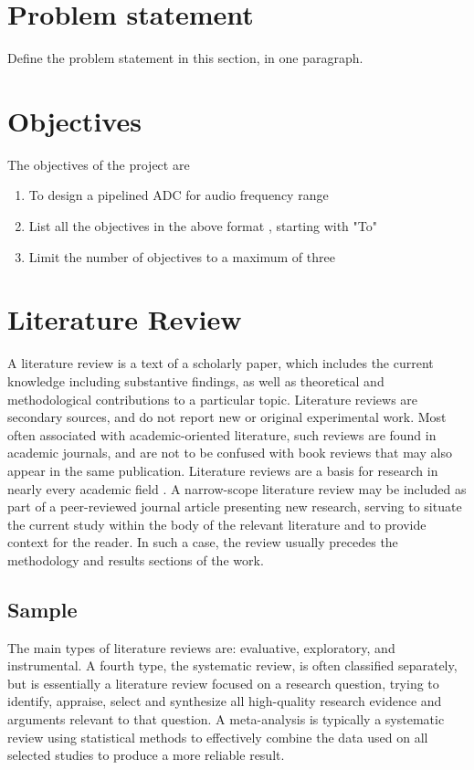 \section[Problem statement]{\textbf{Problem statement}}

Define the problem statement in this section, in one paragraph.

\section[Objectives]{\textbf{Objectives}}
The objectives of the project are
\begin{enumerate}
\item To design a pipelined ADC for audio frequency range
\item List all the objectives in the above format , starting with "To"
\item Limit the number of objectives to a maximum of three
\end{enumerate}

\section[Literature Review]{\textbf{Literature Review}}

A literature review is a text of a scholarly paper, which includes the current knowledge including substantive findings, as well as theoretical and methodological contributions to a particular topic. Literature reviews are secondary sources, and do not report new or original experimental work. Most often associated with academic-oriented literature, such reviews are found in academic journals, and are not to be confused with book reviews that may also appear in the same publication. Literature reviews are a basis for research in nearly every academic field . A narrow-scope literature review may be included as part of a peer-reviewed journal article presenting new research, serving to situate the current study within the body of the relevant literature and to provide context for the reader. In such a case, the review usually precedes the methodology and results sections of the work.

\subsection{Sample}
The main types of literature reviews are: evaluative, exploratory, and instrumental. A fourth type, the systematic review, is often classified separately, but is essentially a literature review focused on a research question, trying to identify, appraise, select and synthesize all high-quality research evidence and arguments relevant to that question. A meta-analysis is typically a systematic review using statistical methods to effectively combine the data used on all selected studies to produce a more reliable result.
